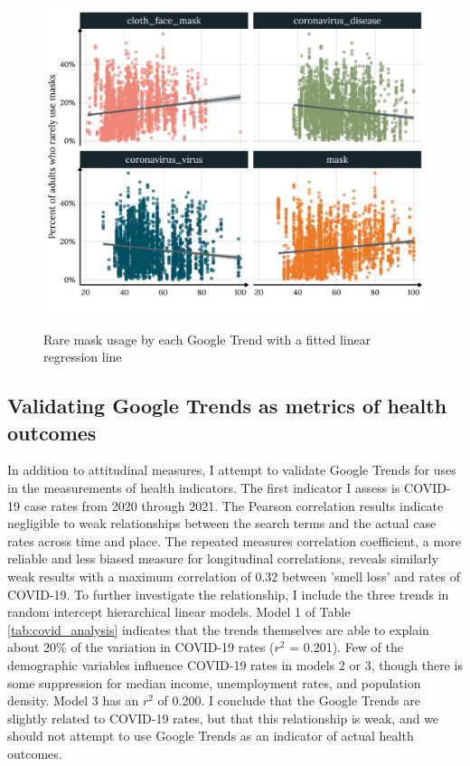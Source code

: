 
\begin{figure}[h]
{\centering \includegraphics[width=0.8\linewidth]{figs/paper1/mask_plot-1.pdf}}
\caption{Rare mask usage by each Google Trend with a fitted linear regression line}\label{fig:mask_plot-1}
\end{figure}


\subsection{Validating Google Trends as metrics of health outcomes}

In addition to attitudinal measures, I attempt to validate Google Trends for
uses in the measurements of health indicators. The first indicator I assess is
COVID-19 case rates from 2020 through 2021. The Pearson correlation results
indicate negligible to weak relationships between the search terms and the
actual case rates across time and place. The repeated measures correlation
coefficient, a more reliable and less biased measure for longitudinal
correlations, reveals similarly weak results with a maximum correlation of 0.32
between 'smell loss' and rates of COVID-19. To further investigate the relationship, I
include the three trends in random intercept hierarchical linear models. Model 1
of Table \ref{tab:covid_analysis} indicates that the trends themselves are able
to explain about 20\% of the variation in COVID-19 rates ($r^2$ = 0.201). Few
of the demographic variables influence COVID-19 rates in models 2 or 3,
though there is some suppression for median income, unemployment rates,
and population density. Model 3 has an $r^2$ of 0.200. I conclude that the
Google Trends are slightly related to COVID-19 rates, but that this relationship
is weak, and we should not attempt to use Google Trends as an indicator of actual
health outcomes.

